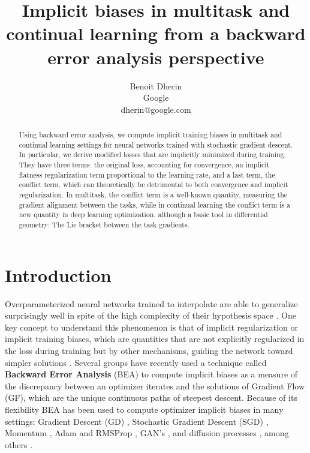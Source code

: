 \documentclass{article}
\title{Implicit biases in multitask and continual learning from a backward error analysis perspective}
\author{%
  Benoit Dherin \\
  Google\\
  dherin@google.com\\
}
\begin{document}
\maketitle


\begin{abstract}
Using backward error analysis, we compute implicit training biases in multitask and continual learning settings for neural networks trained with stochastic gradient descent. In particular, we derive modified losses that are implicitly minimized during training. They have three terms: the original loss, accounting for convergence, an implicit flatness regularization term proportional to the learning rate, and a last term, the conflict term, which can theoretically be detrimental to both convergence and implicit regularization. 
In multitask, the conflict term is a well-known quantity, measuring the gradient alignment between the tasks, while in continual learning the conflict term is a new quantity in deep learning optimization, although a basic tool in differential geometry: The Lie bracket between the task gradients. 
\end{abstract}


\section{Introduction}

Overparameterized neural networks trained to interpolate are able to generalize surprisingly well in spite of the high complexity of their hypothesis space \cite{belkin_2021}. 
One key concept to understand this phenomenon is that of implicit regularization or implicit training biases, which are quantities that are not explicitly regularized in the loss during training but by other mechanisms, guiding the network toward simpler solutions \cite{dherin2022why,Dherin2021TheGO}.
Several groups \cite{barrett2021implicit,smith2021on,rosca2023on,rosca2021discretization,fraca2021symplectic_integration,gao2023diffusion_bea,li2017stochastic,lu2020resolution_ode, rosca2023implicit_regularization,miyagawa2022equation_of_motion,cattaneo2023implicit_bias_adam,barba2021federated} have recently used a technique called {\bf Backward Error Analysis} (BEA) to compute implicit biases
as a measure of the discrepancy between an optimizer iterates and the solutions of Gradient Flow (GF), which are the unique continuous paths of steepest descent.
Because of its flexibility BEA has been used to compute optimizer implicit biases in many settings: Gradient Descent (GD) \cite{barrett2021implicit}, Stochastic Gradient Descent (SGD) \cite{smith2021on,li2017stochastic}, Momentum \cite{ghosh2023implicit}, Adam and RMSProp \cite{cattaneo2023implicit_bias_adam}, GAN's \cite{rosca2021discretization,rosca2023implicit_regularization,lu2020resolution_ode}, and diffusion processes \cite{gao2023diffusion_bea}, among others
\cite{rosca2023on,fraca2021symplectic_integration,miyagawa2022equation_of_motion,barba2021federated}.
\end{document}
